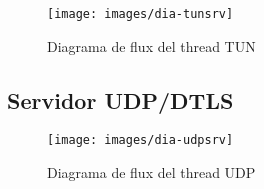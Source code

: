 \begin{figure}[htb]
\centering
\texttt{[image: images/dia-tunsrv]}
\caption{Diagrama de flux del thread TUN}
\label{F:dia-tunsrv}
\end{figure}
\clearpage%
\subsection{Servidor UDP/DTLS}
\begin{figure}[htb]
\centering
\texttt{[image: images/dia-udpsrv]}
\caption{Diagrama de flux del thread UDP}
\label{F:dia-udpsrv}
\end{figure}
